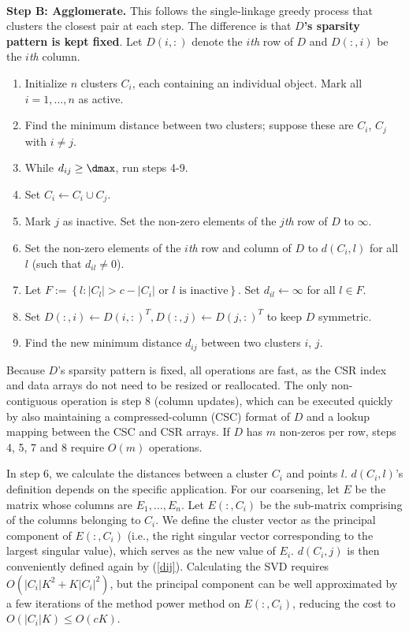 \documentclass{article} %
\begin{document}
{\mbox{}}\\ \noindent
\textbf{Step B: Agglomerate.} This follows the single-linkage greedy process that clusters the closest pair at each step. The difference is that \textbf{$D$'s sparsity pattern is kept fixed}. Let $D(i, :)$ denote the $i${\it th} row of $D$ and $D(:, i)$ be the $i${\it th} column. 
\begin{enumerate}
	\item Initialize $n$ clusters $C_i$, each containing an individual object. Mark all $i=1,\dots,n$ as active. 
	\item Find the minimum distance between two clusters; suppose these are $C_i$, $C_j$ with $i \not = j$.
	\item While $d_{ij} \geq \dmax$, run steps 4-9.
	\item Set $C_i \leftarrow C_i \cup C_j$.
	\item Mark $j$ as inactive. Set the non-zero elements of the $j${\it th} row of $D$ to $\infty$.
	\item Set the non-zero elements of the $i${\it th} row and column of $D$ to $d(C_i, l)$ for all $l$ (such that $d_{il} \not = 0$).
	\item  Let $F := \left\{ l : |C_l| > c - |C_i| {\mbox{ or }} l {\mbox{ is inactive}} \right\}$. Set $d_{il} \leftarrow \infty$ for all $l \in F$.
	\item Set $D(:, i) \leftarrow D(i, :)^T, D(:, j) \leftarrow D(j, :)^T$ to keep $D$ symmetric.
	\item Find the new minimum distance $d_{ij}$ between two clusters $i$, $j$.
\end{enumerate}
Because $D$'s sparsity pattern is fixed, all operations are fast, as the CSR index and data arrays do not need to be resized or reallocated. The only non-contiguous operation is step $8$ (column updates), which can be executed quickly by also maintaining a compressed-column (CSC) format of $D$ and a lookup mapping between the CSC and CSR arrays. If $D$ has $m$ non-zeros per row, steps 4, 5, 7 and 8 require $O(m)$ operations.

In step 6, we calculate the distances between a cluster $C_i$ and points $l$. $d(C_i, l)$'s definition depends on the specific application. For our coarsening, let $E$ be the matrix whose columns are $E_1,\dots,E_n$. Let $E(:, C_i)$ be the sub-matrix comprising of the columns belonging to $C_i$. We define the cluster vector as the principal component of $E(:, C_i)$ (i.e., the right singular vector corresponding to the largest singular value), which serves as the new value of $E_i$. $d(C_i, j)$ is then conveniently defined again by (\ref{dij}). Calculating the SVD requires $O(|C_i| K^2 + K |C_i|^2)$, but the principal component can be well approximated by a few iterations of the method power method on $E(:, C_i)$, reducing the cost to $O(|C_i| K) \leq O(c K)$.
\end{document}
